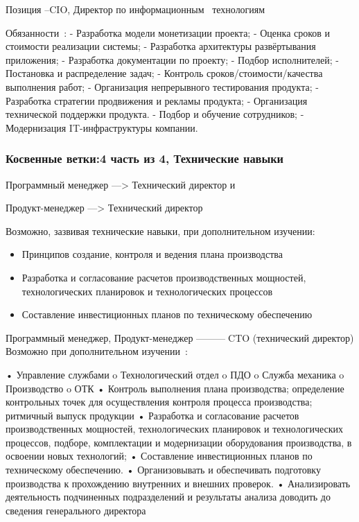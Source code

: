 \documentclass{../industrial-development}
\begin{document}
{\lecturenotes
	Позиция –CIO, Директор по информационным~\cite{hh} технологиям~\cite{itcf}

Обязанности~\cite{rab}:
- Разработка модели монетизации проекта;
- Оценка сроков и стоимости реализации системы;
- Разработка архитектуры развёртывания приложения;
- Разработка документации по проекту;
- Подбор исполнителей;
- Постановка и распределение задач;
- Контроль сроков/стоимости/качества выполнения работ;
- Организация непрерывного тестирования продукта;
- Разработка стратегии продвижения и рекламы продукта;
- Организация технической поддержки продукта.
- Подбор и обучение сотрудников;
- Модернизация IT-инфраструктуры компании.


\begin{frame} \frametitle{Косвенные ветки:4 часть из 4, Технические навыки}

\begin{block}{Программный менеджер ---> Технический директор  и

Продукт-менеджер ---> Технический директор }

Возможно, зазвивая технические навыки, при дополнительном изучении:
  \end{block}
\begin{itemize}
  \item Принципов создание, контроля и ведения плана производства
  \item Разработка и согласование расчетов производственных мощностей, технологических планировок и технологических процессов
\item Составление инвестиционных планов по техническому обеспечению
  \end{itemize}
\end{frame}

\lecturenotes
Программный менеджер, Продукт-менеджер ---------CTO (технический директор)
Возможно при дополнительном изучении~\cite{rab}:
 
•	Управление службами
o	Технологический отдел
o	ПДО
o	Служба механика
o	Производство
o	ОТК
•	Контроль выполнения плана производства; определение контрольных точек для осуществления контроля процесса производства; ритмичный выпуск продукции
•	Разработка и согласование расчетов производственных мощностей, технологических планировок и технологических процессов, подборе, комплектации и модернизации оборудования производства, в освоении новых технологий;
•	Составление инвестиционных планов по техническому обеспечению.
•	Организовывать и обеспечивать подготовку производства к прохождению внутренних и внешних проверок.
•	Анализировать деятельность подчиненных подразделений и результаты анализа доводить до сведения генерального директора


}
\end{document}

